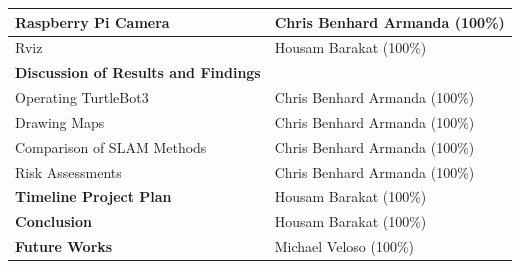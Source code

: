 \documentclass[12pt]{report}
\begin{document}
\begin{table}[!htb]
\begin{tabular}{|l|l|}
Raspberry Pi Camera                                                                                 & Chris Benhard Armanda (100\%)                                                                \\ \hline
Rviz                                                                                                & Housam Barakat (100\%)                                                                       \\ \hline
\textbf{Discussion of Results and Findings}                                                         &                                                                                              \\ \hline
Operating TurtleBot3                                                                                & Chris Benhard Armanda (100\%)                                                                \\ \hline
Drawing Maps                                                                                        & Chris Benhard Armanda (100\%)                                                                \\ \hline
Comparison of SLAM Methods                                                                          & Chris Benhard Armanda (100\%)                                                                \\ \hline
Risk Assessments                                                                                    & Chris Benhard Armanda (100\%)                                                                \\ \hline
\textbf{Timeline Project Plan}                                                                      & Housam Barakat (100\%)                                                                       \\ \hline
\textbf{Conclusion}                                                                                 & Housam Barakat (100\%)                                                                       \\ \hline
\textbf{Future Works}                                                                               & Michael Veloso (100\%)                                                                       \\ \hline
\end{tabular}
\end{table}
\end{document}
